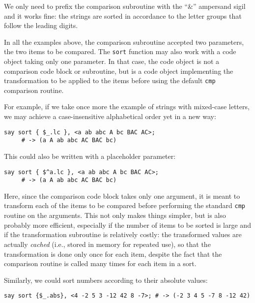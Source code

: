 We only need to prefix the comparison subroutine with the 
``\&'' ampersand sigil and it works fine: the strings are sorted 
in accordance to the letter groups that follow the leading digits.

In all the examples above, the comparison subroutine 
accepted two parameters, the two items to be compared. 
The {\tt sort} function may also work with a code object 
taking only one parameter. In that case, the code object 
is not a comparison code block or subroutine, but is a 
code object implementing the transformation to be 
applied to the items before using the default {\tt cmp} 
comparison routine. 

For example, if we take once more the example of strings 
with mixed-case letters, we may achieve a case-insensitive 
alphabetical order yet in a new way:

\begin{verbatim}
say sort { $_.lc }, <a ab abc A bc BAC AC>;
     # -> (a A ab abc AC BAC bc)
\end{verbatim}

This could also be written with a placeholder parameter:

\begin{verbatim}
say sort { $^a.lc }, <a ab abc A bc BAC AC>;
     # -> (a A ab abc AC BAC bc)
\end{verbatim}

Here, since the comparison code block takes only one 
argument, it is meant to transform each of the items 
to be compared before performing the standard {\tt cmp} routine on 
the arguments. This not only makes things simpler, 
but is also probably more efficient, especially if 
the number of items to be sorted is large and if the 
transformation subroutine is relatively costly: the 
transformed values are actually \emph{cached} (i.e., 
stored in memory for repeated use), so that the 
transformation is done only once for each item, despite 
the fact that the comparison routine is called many times 
for each item in a sort.

Similarly, we could sort numbers according to their 
absolute values:

\begin{verbatim}
say sort {$_.abs}, <4 -2 5 3 -12 42 8 -7>; # -> (-2 3 4 5 -7 8 -12 42)
\end{verbatim}

